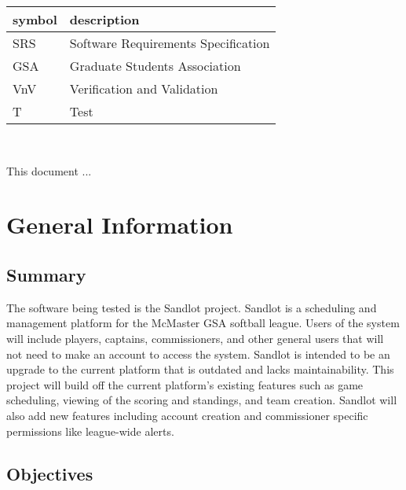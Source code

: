 \documentclass[12pt, titlepage]{article}
\begin{document}
\renewcommand{\arraystretch}{1.2}
\begin{tabular}{l l} 
  \toprule		
  \textbf{symbol} & \textbf{description}\\
  \midrule 
  SRS & Software Requirements Specification\\
  GSA & Graduate Students Association\\
  VnV & Verification and Validation\\
  T & Test\\
  \bottomrule
\end{tabular}\\



\newpage


This document ... 

\section{General Information}

\subsection{Summary}


The software being tested is the Sandlot project. Sandlot is a scheduling and
management platform for the McMaster GSA softball league. Users of the system
will include players, captains, commissioners, and other general users that will
not need to make an account to access the system. Sandlot is intended to be an
upgrade to the current platform that is outdated and lacks maintainability. This
project will build off the current platform's existing features such as game
scheduling, viewing of the scoring and standings, and team creation. Sandlot will
also add new features including account creation and commissioner specific
permissions like league-wide alerts.

\subsection{Objectives}
\end{document}
